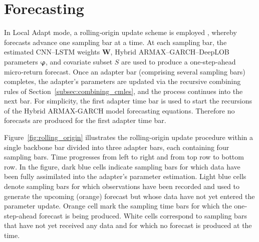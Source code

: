 \documentclass[10pt,a4paper,oneside]{article}
\newcommand{\Prob}{\mathbb{P}}
\DeclarePairedDelimiter{\aval}{\lvert}{\rvert} %
\begin{document}



\section{Forecasting}
\label{sec:forecasting}

In Local Adapt mode, a rolling‐origin update scheme is employed \cite{meisenbacher2022review}, whereby forecasts advance one sampling bar at a time.  At each sampling bar, the estimated CNN–LSTM weights \(\mathbf{W}\), Hybrid ARMAX–GARCH–DeepLOB parameters \(\boldsymbol{\varphi}\), and covariate subset \(S\) are used to produce a one‐step‐ahead micro‐return forecast.  Once an adapter bar (comprising several sampling bars) completes, the adapter’s parameters are updated via the recursive combining rules of Section~\ref{subsec:combining_cmles}, and the process continues into the next bar. For simplicity, the first adapter time bar is used to start the recursions of the Hybrid ARMAX-GARCH model forecasting equations. Therefore no forecasts are produced for the first adapter time bar.

Figure~\ref{fig:rolling_origin} illustrates the rolling-origin update procedure within a single backbone bar divided into three adapter bars, each containing four sampling bars. Time progresses from left to right and from top row to bottom row. In the figure, dark blue cells indicate sampling bars for which data have been fully assimilated into the adapter’s parameter estimation. Light blue cells denote sampling bars for which observations have been recorded and used to generate the upcoming (orange) forecast but whose data have not yet entered the parameter update. Orange cell mark the sampling time bars for which the one‐step‐ahead forecast is being produced. White cells correspond to sampling bars that have not yet received any data and for which no forecast is produced at the time.
\end{document}
